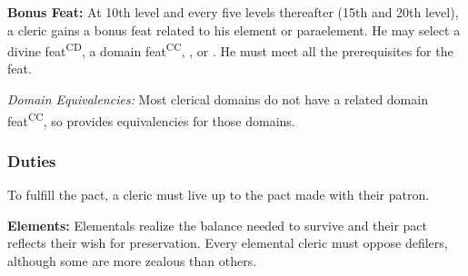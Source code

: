 \textbf{Bonus Feat:} At 10th level and every five levels thereafter (15th and 20th level), a cleric gains a bonus feat related to his element or paraelement. He may select a divine feat\textsuperscript{CD}, a domain feat\textsuperscript{CC}, , or . He must meet all the prerequisites for the feat.

\textit{Domain Equivalencies:} Most clerical domains do not have a related domain feat\textsuperscript{CC}, so  provides equivalencies for those domains.



\subsubsection{Duties}
To fulfill the pact, a cleric must live up to the pact made with their patron.

\textbf{Elements:} Elementals realize the balance needed to survive and their pact reflects their wish for preservation. Every elemental cleric must oppose defilers, although some are more zealous than others.


